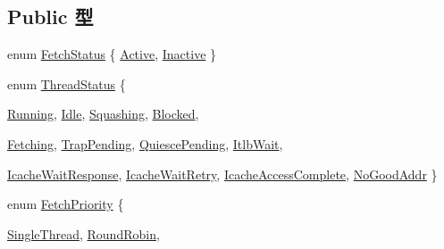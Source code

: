 \subsection*{Public 型}
\begin{DoxyCompactItemize}
\item 
enum \hyperlink{classDefaultFetch_a64605db3d589dcf77a170612ff89515e}{FetchStatus} \{ \hyperlink{classDefaultFetch_a64605db3d589dcf77a170612ff89515ea26bd8444261cc58df7a86753c79d2520}{Active}, 
\hyperlink{classDefaultFetch_a64605db3d589dcf77a170612ff89515ea969c924a722daf6334fca64346092ae6}{Inactive}
 \}
\item 
enum \hyperlink{classDefaultFetch_ae2739961013a00cede621d4d72f2173c}{ThreadStatus} \{ \par
\hyperlink{classDefaultFetch_ae2739961013a00cede621d4d72f2173ca2f5f2c4a8c4f4f0519d503dcdfbf55cb}{Running}, 
\hyperlink{classDefaultFetch_ae2739961013a00cede621d4d72f2173cad3fa9ae9431d6cb1772f9d9df48cab19}{Idle}, 
\hyperlink{classDefaultFetch_ae2739961013a00cede621d4d72f2173ca22a648855197e326dc88f548634c0ec7}{Squashing}, 
\hyperlink{classDefaultFetch_ae2739961013a00cede621d4d72f2173ca9463ee9b8700258a1019b4b9d2d77a30}{Blocked}, 
\par
\hyperlink{classDefaultFetch_ae2739961013a00cede621d4d72f2173ca718b7867aa13dd84937c83334380edee}{Fetching}, 
\hyperlink{classDefaultFetch_ae2739961013a00cede621d4d72f2173ca8c49adf6da5f507150d403610c684877}{TrapPending}, 
\hyperlink{classDefaultFetch_ae2739961013a00cede621d4d72f2173ca6dd2239b509a3ed085ad3bddda99cb16}{QuiescePending}, 
\hyperlink{classDefaultFetch_ae2739961013a00cede621d4d72f2173ca2872442035b8be061f050fdf94761d33}{ItlbWait}, 
\par
\hyperlink{classDefaultFetch_ae2739961013a00cede621d4d72f2173caa694766f134e9cd81f5ad5b91dedf852}{IcacheWaitResponse}, 
\hyperlink{classDefaultFetch_ae2739961013a00cede621d4d72f2173ca2a36c8d85e537909b8fa14af846e48a3}{IcacheWaitRetry}, 
\hyperlink{classDefaultFetch_ae2739961013a00cede621d4d72f2173caff0dbe49b2bc9aee96de6b007b5b826e}{IcacheAccessComplete}, 
\hyperlink{classDefaultFetch_ae2739961013a00cede621d4d72f2173caadf72b4e66cdfa8a56beab05bb411da6}{NoGoodAddr}
 \}
\item 
enum \hyperlink{classDefaultFetch_a818d5f50fdcec74a1a445b4fa8b760e3}{FetchPriority} \{ \par
\hyperlink{classDefaultFetch_a818d5f50fdcec74a1a445b4fa8b760e3ae01d52cbe97a50e79f4195cd27b3185b}{SingleThread}, 
\hyperlink{classDefaultFetch_a818d5f50fdcec74a1a445b4fa8b760e3a5c08841de48c15133dd26a4d9d740a11}{RoundRobin}, 

\end{DoxyCompactItemize}
